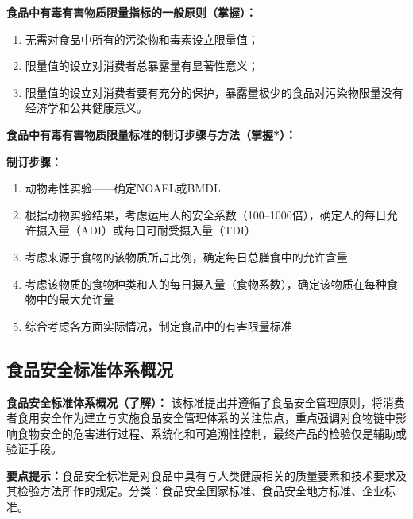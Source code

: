 \begin{keybox}
\textbf{食品中有毒有害物质限量指标的一般原则（掌握）：}
\begin{enumerate}[leftmargin=*]
    \item 无需对食品中所有的污染物和毒素设立限量值；
    \item 限量值的设立对消费者总暴露量有显著性意义；
    \item 限量值的设立对消费者要有充分的保护，暴露量极少的食品对污染物限量没有经济学和公共健康意义。
\end{enumerate}

\textbf{食品中有毒有害物质限量标准的制订步骤与方法（掌握*）：}

\textbf{制订步骤：}
\begin{enumerate}[leftmargin=*]
    \item 动物毒性实验——确定NOAEL或BMDL
    \item 根据动物实验结果，考虑运用人的安全系数（100--1000倍），确定人的每日允许摄入量（ADI）或每日可耐受摄入量（TDI）
    \item 考虑来源于食物的该物质所占比例，确定每日总膳食中的允许含量
    \item 考虑该物质的食物种类和人的每日摄入量（食物系数），确定该物质在每种食物中的最大允许量
    \item 综合考虑各方面实际情况，制定食品中的有害限量标准
\end{enumerate}
\end{keybox}

\subsection{食品安全标准体系概况}

\begin{defbox}
\textbf{食品安全标准体系概况（了解）：}
该标准提出并遵循了食品安全管理原则，将消费者食用安全作为建立与实施食品安全管理体系的关注焦点，重点强调对食物链中影响食物安全的危害进行过程、系统化和可追溯性控制，最终产品的检验仅是辅助或验证手段。
\end{defbox}

\begin{tipbox}
\textbf{要点提示：}食品安全标准是对食品中具有与人类健康相关的质量要素和技术要求及其检验方法所作的规定。分类：食品安全国家标准、食品安全地方标准、企业标准。
\end{tipbox}

